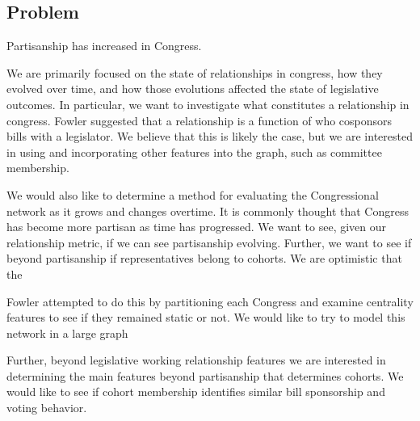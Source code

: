 \subsection{Problem}

Partisanship has increased in Congress.

We are primarily focused on the state of relationships in congress, how 
they evolved over time, and how those evolutions affected the state of 
legislative outcomes. In particular, we want to investigate what constitutes a 
relationship in congress. Fowler suggested that a relationship is a function 
of who cosponsors bills with a legislator. We believe that this is likely the 
case, but we are interested in using and incorporating other features into 
the graph, such as committee membership. 

We would also like to determine a method for evaluating the Congressional
network as it grows and changes overtime. It is commonly thought that Congress
has become more partisan as time has progressed. We want to see, given our
relationship metric, if we can see partisanship evolving. Further, we want to
see if beyond partisanship if representatives belong to cohorts. We are 
optimistic that the

Fowler attempted to do this by  partitioning each Congress and examine
centrality features to see if they  remained static or not. We would like to try
to model this network in a  large graph


Further, beyond legislative working relationship features we are interested in 
determining the main features beyond partisanship that determines cohorts. We 
would like to see if cohort membership identifies similar bill sponsorship and 
voting behavior.

